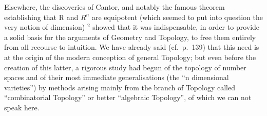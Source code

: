 Elsewhere, the discoveries of Cantor, and notably the famous theorem establishing that R and \(R^{n}\) are equipotent (which seemed to put into question the very notion of dimension) \(^{2}\) showed that it was indispensable, in order to provide a solid basis for the arguments of Geometry and Topology, to free them entirely from all recourse to intuition. We have already said (cf.~p.~139) that this need is at the origin of the modern conception of general Topology; but even before the creation of this latter, a rigorous study had begun of the topology of number spaces and of their most immediate generalisations (the ``n dimensional varieties'') by methods arising mainly from the branch of Topology called ``combinatorial Topology'' or better ``algebraic Topology'', of which we can not speak here.
